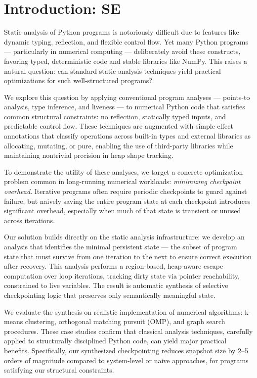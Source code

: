 
\section{Introduction: SE}
Static analysis of Python programs is notoriously difficult due to features like dynamic typing, reflection, and flexible control flow. Yet many Python programs --- particularly in numerical computing --- deliberately avoid these constructs, favoring typed, deterministic code and stable libraries like NumPy. This raises a natural question: can standard static analysis techniques yield practical optimizations for such well-structured programs?

We explore this question by applying conventional program analyses --- points-to analysis, type inference, and liveness --- to numerical Python code that satisfies common structural constraints: no reflection, statically typed inputs, and predictable control flow. These techniques are augmented with simple effect annotations that classify operations across built-in types and external libraries as allocating, mutating, or pure, enabling the use of third-party libraries while maintaining nontrivial precision in heap shape tracking.

To demonstrate the utility of these analyses, we target a concrete optimization problem common in long-running numerical workloads: \emph{minimizing checkpoint overhead}. Iterative programs often require periodic checkpoints to guard against failure, but naively saving the entire program state at each checkpoint introduces significant overhead, especially when much of that state is transient or unused across iterations.

Our solution builds directly on the static analysis infrastructure: we develop an analysis that identifies the minimal persistent state --- the subset of program state that must survive from one iteration to the next to ensure correct execution after recovery. This analysis performs a region-based, heap-aware escape computation over loop iterations, tracking dirty state via pointer reachability, constrained to live variables. The result is automatic synthesis of selective checkpointing logic that preserves only semantically meaningful state.

We evaluate the synthesis on realistic implementation of numerical algorithms: k-means clustering, orthogonal matching pursuit (OMP), and graph search procedures. These case studies confirm that classical analysis techniques, carefully applied to structurally disciplined Python code, can yield major practical benefits. Specifically, our synthesized checkpointing reduces snapshot size by 2–5 orders of magnitude compared to system-level or naive approaches, for programs satisfying our structural constraints.

